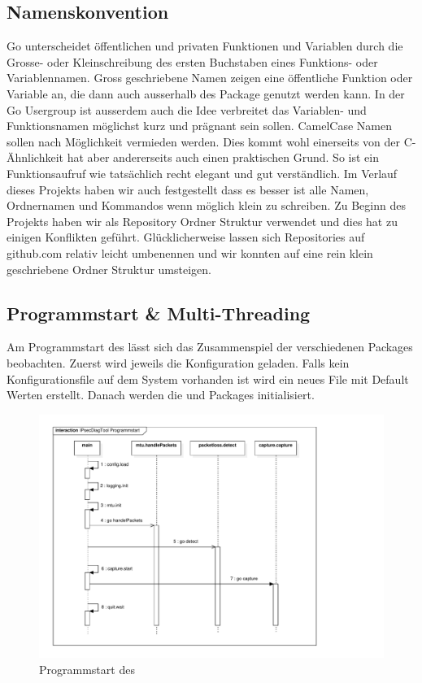 \subsection{Namenskonvention}
Go unterscheidet öffentlichen und privaten Funktionen und Variablen durch die Grosse- oder Kleinschreibung des ersten Buchstaben eines Funktions- oder Variablennamen. Gross geschriebene Namen zeigen eine öffentliche Funktion oder Variable an, die dann auch ausserhalb des Package genutzt werden kann.
In der Go Usergroup ist ausserdem auch die Idee verbreitet das Variablen- und Funktionsnamen möglichst kurz und prägnant sein sollen. CamelCase Namen sollen nach Möglichkeit vermieden werden. Dies kommt wohl einerseits von der C-Ähnlichkeit hat aber andererseits auch einen praktischen Grund. So ist ein Funktionsaufruf wie  tatsächlich recht elegant und gut verständlich.
Im Verlauf dieses Projekts haben wir auch festgestellt dass es besser ist alle Namen, Ordnernamen und Kommandos wenn möglich klein zu schreiben. Zu Beginn des Projekts haben wir  als Repository Ordner Struktur verwendet und dies hat zu einigen Konflikten geführt. Glücklicherweise lassen sich Repositories auf github.com relativ leicht umbenennen und wir konnten auf eine rein klein geschriebene Ordner Struktur umsteigen.

\subsection{Programmstart \& Multi-Threading}
Am Programmstart des \tool{} lässt sich das Zusammenspiel der verschiedenen Packages beobachten. Zuerst wird jeweils die Konfiguration geladen. Falls kein Konfigurationsfile auf dem System vorhanden ist wird ein neues File mit Default Werten erstellt. Danach werden die  und  Packages initialisiert.

\begin{figure}[ht]
    \begin{center}
        \includegraphics[trim=30 20 150 30,clip,width=\textwidth]{mainpart/implementation/img/programmstart}
    \end{center}
    \caption{Programmstart des \tool{}}
\end{figure}

